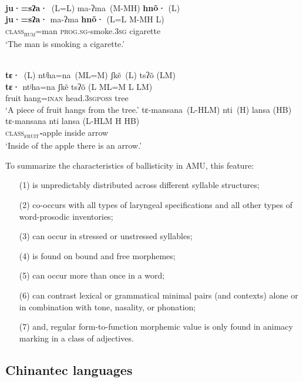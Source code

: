 \documentclass[output=paper]{langscibook}
\begin{document}
\ea\label{ex:dobui:13}
{\label{bkm:Ref101355886} \citet{ELA2012}}\\
\glll  \textbf{ju·=sʔa·}~(L=L) ma-ʔma~(M-MH) \textbf{hnõ·} (L)\\
       \textbf{ju·=sʔa·}       ma-ʔma        \textbf{hnõ·} {(L=L M-MH L)}\\
     \textsc{class}\textsc{\textsubscript{hum}}=man \textsc{prog.sg}-smoke.3\textsc{sg} cigarette\\
\glt ‘The man is smoking a cigarette.’
\z

\ea\label{ex:dobui:14}
{\citet{ELA2012}}\\
\ea\label{ex:dobui:14a}
\glll \textbf{tɛ·}~(L) ntʲha=na~(ML=M) ʃkẽ~(L) tsʔõ (LM)\\
      \textbf{tɛ·}     ntʲha=na        ʃkẽ     tsʔõ {(L ML=M L LM)}\\
     fruit hang=\textsc{inan} head.\textsc{3sgposs} tree\\
\glt ‘A piece of fruit hangs from the tree.’
\ex\label{ex:dobui:14b}
\glll  tɛ-mansana~(L-HLM) nti~(H) lansa (HB)\\
       tɛ-mansana         nti     lansa {(L-HLM H HB)}\\
     \textsc{class}\textsc{\textsubscript{fruit}}\textbf{\textit{-}}apple inside arrow\\
\glt ‘Inside of the apple there is an arrow.’
\z
\z

To summarize the characteristics of ballisticity in AMU, this feature:

\begin{itemize}
\item[(1)] is unpredictably distributed across different syllable structures;
\item[(2)] co-occurs with all types of laryngeal specifications and all other types of word-prosodic inventories;
\item[(3)] can occur in stressed or unstressed syllables;
\item[(4)] is found on bound and free morphemes;
\item[(5)] can occur more than once in a word;
\item[(6)] can contrast lexical or grammatical minimal pairs (and contexts) alone or in combination with tone, nasality, or phonation;
\item[(7)] and, regular form-to-function morphemic value is only found in animacy marking in a class of adjectives.
\end{itemize}

\subsection{Chinantec languages}
\end{document}
